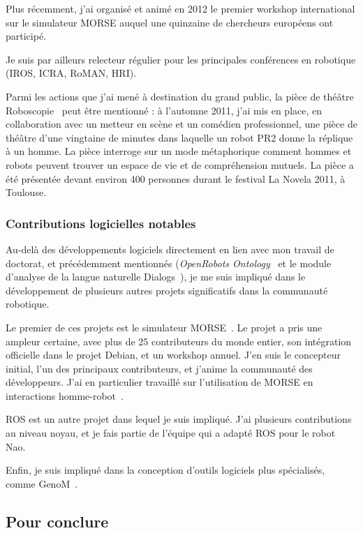 \documentclass[a4paper]{article}
\begin{document}
Plus récemment, j'ai organisé et animé en 2012 le premier workshop international
sur le simulateur MORSE auquel une quinzaine de chercheurs européens ont participé.

Je suis par ailleurs relecteur régulier pour les principales conférences en
robotique (IROS, ICRA, RoMAN, HRI).

Parmi les actions que j'ai mené à destination du grand public, la pièce de
théâtre Roboscopie~\cite{lemaignan2012roboscopie} peut être mentionné : à l'automne
2011, j'ai mis en place, en collaboration avec un metteur en scène et un
comédien professionnel, une pièce de théâtre d'une vingtaine de minutes dans
laquelle un robot PR2 donne la réplique à un homme. La pièce interroge sur un
mode métaphorique comment hommes et robots peuvent trouver un espace de vie et
de compréhension mutuels. La pièce a été présentée devant environ 400 personnes
durant le festival La Novela 2011, à Toulouse.

\subsubsection*{Contributions logicielles notables}

Au-delà des développements logiciels directement en lien avec mon travail de
doctorat, et précédemment mentionnés (\emph{OpenRobots
Ontology}~\cite{lemaignan2010oro} et le module d'analyse de la langue naturelle
{\sc Dialogs}~\cite{lemaignan2011grounding}), je me suis impliqué dans le développement
de plusieurs autres projets significatifs dans la communauté robotique.

Le premier de ces projets est le simulateur MORSE~\cite{echeverria2011modular,
echeverria2012simulating}. Le projet a pris une ampleur certaine, avec plus de
25 contributeurs du monde entier, son intégration officielle dans le projet
Debian, et un workshop annuel. J'en suis le concepteur initial, l'un des
principaux contributeurs, et j'anime la communauté des développeurs. J'ai en
particulier travaillé sur l'utilisation de MORSE en interactions
homme-robot~\cite{lemaignan2012morse,lemaignan2014simulation}.

ROS est un autre projet dans lequel je suis impliqué.  J'ai plusieurs
contributions au niveau noyau, et je fais partie de l'équipe qui a adapté ROS
pour le robot Nao.

Enfin, je suis impliqué dans la conception d'outils logiciels plus spécialisés,
comme GenoM~\cite{mallet2010genom3}.

\subsection*{Pour conclure}
\end{document}
